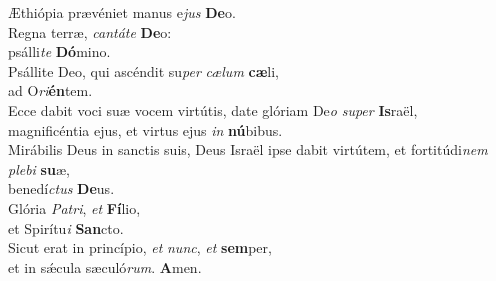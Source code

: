 \evenverse Æthiópia prævéniet manus e\textit{jus} \textbf{De}o.\\
\oddverse Regna terræ, \textit{can}\textit{tá}\textit{te} \textbf{De}o:~\*\\
\oddverse psálli\textit{te} \textbf{Dó}mino.\\
\evenverse Psállite Deo, qui ascéndit su\textit{per} \textit{cæ}\textit{lum} \textbf{cæ}li,~\*\\
\evenverse ad O\textit{ri}\textbf{én}tem.\\
\oddverse Ecce dabit voci suæ vocem virtútis, date glóriam De\textit{o} \textit{su}\textit{per} \textbf{Is}raël,~\*\\
\oddverse magnificéntia ejus, et virtus ejus \textit{in} \textbf{nú}bibus.\\
\evenverse Mirábilis Deus in sanctis suis, Deus Israël ipse dabit virtútem, et fortitúdi\textit{nem} \textit{ple}\textit{bi} \textbf{su}æ,~\*\\
\evenverse benedí\textit{ctus} \textbf{De}us.\\
\oddverse Glória \textit{Pa}\textit{tri}, \textit{et} \textbf{Fí}lio,~\*\\
\oddverse et Spirítu\textit{i} \textbf{San}cto.\\
\evenverse Sicut erat in princípio, \textit{et} \textit{nunc}, \textit{et} \textbf{sem}per,~\*\\
\evenverse et in sǽcula sæculó\textit{rum}. \textbf{A}men.\\
